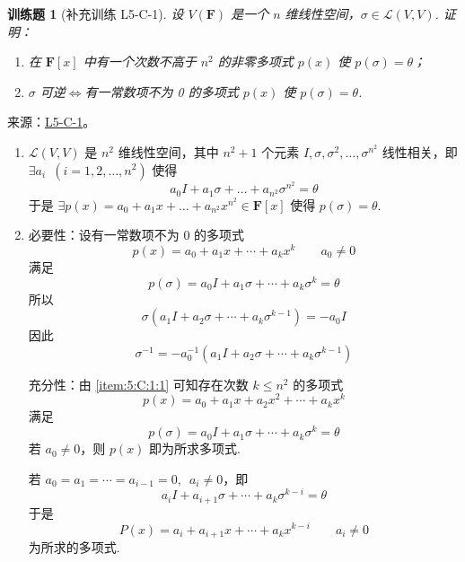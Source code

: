 \documentclass[UTF8,12pt,a4paper,fontset=fandol]{ctexart}
\newtheorem{exercise}{训练题}[section]
\begin{document}
\begin{exercise}[补充训练 L5-C-1]\label{prob:L5-C-1}
设 $V(\mathbf{F})$ 是一个 $n$ 维线性空间，$\sigma \in \mathcal{L}(V,V)$. 证明：
        \begin{enumerate}
            \item 在 $\mathbf{F}[x]$ 中有一个次数不高于 $n^2$ 的非零多项式 $p(x)$ 使 $p(\sigma) = \theta$；

            \item $\sigma$ 可逆$\iff$有一常数项不为 0 的多项式 $p(x)$ 使 $p(\sigma) = \theta$.
        \end{enumerate}
\end{exercise}
\noindent 来源：\href{https://github.com/yhwu-is/Linear-Algebra-Left-Undone/blob/new/%E8%AE%B2%E4%B9%89/%E4%B8%93%E9%A2%98/5%20%E7%BA%BF%E6%80%A7%E6%98%A0%E5%B0%84.tex}{L5-C-1}。
\begin{solve}
\begin{enumerate}
                \item \label{item:5:C:1:1}
                      $ \mathcal{L}(V, V) $ 是 $ n^2 $ 维线性空间，其中 $ n^2 + 1 $ 个元素 $ I, \sigma, \sigma^2, \ldots, \sigma^{n^2} $ 线性相关，即 $ \exists a_i\enspace (i = 1, 2, \ldots, n^2) $ 使得
                      \[ a_0 I + a_1 \sigma + \ldots + a_{n^2} \sigma^{n^2} = \theta \]
                      于是 $ \exists p(x) = a_0 + a_1 x + \ldots + a_{n^2} x^{n^2} \in \mathbf{F}[x] $ 使得 $ p(\sigma) = \theta $.

                \item 必要性：设有一常数项不为 0 的多项式
                      \[ p(x) = a_0 + a_1 x + \cdots + a_k x^k \qquad a_0 \neq 0 \]
                      满足
                      \[ p(\sigma) = a_0 I + a_1 \sigma + \cdots + a_k \sigma^k = \theta \]
                      所以
                      \[ \sigma(a_1 I + a_2 \sigma + \cdots + a_k \sigma^{k - 1}) = -a_0 I \]
                      因此
                      \[ \sigma^{-1} = -a_0^{-1} (a_1 I + a_2 \sigma + \cdots + a_k \sigma^{k - 1}) \]

                      充分性：由 \eqref{item:5:C:1:1} 可知存在次数 $ k \leqslant n^2 $ 的多项式
                      \[ p(x) = a_0 + a_1 x + a_2 x^2 + \cdots + a_k x^k \]
                      满足
                      \[ p(\sigma) = a_0 I + a_1 \sigma + \cdots + a_k \sigma^k = \theta \]
                      若 $ a_0 \neq 0 $，则 $ p(x) $ 即为所求多项式.

                      若 $ a_0 = a_1 = \cdots = a_{i - 1} = 0,\enspace a_i \neq 0 $，即
                      \[ a_i I + a_{i + 1} \sigma + \cdots + a_k \sigma^{k - i} = \theta \]
                      于是
                      \[ P(x) = a_i + a_{i + 1} x + \cdots + a_k x^{k - i} \qquad a_i \neq 0 \]
                      为所求的多项式.
            \end{enumerate}
\end{solve}
\end{document}
